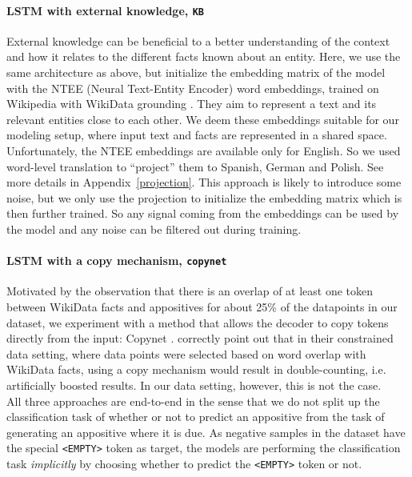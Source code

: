 \documentclass[11pt]{article}
\newcommand{\jttodo}[1]{\todo[color=blue!20]{#1}}
\begin{document}
\paragraph{LSTM with external knowledge, \texttt{KB}}
External knowledge can be beneficial to a better understanding of the context and how it relates to the different facts known about an entity. Here, we use the same architecture as above, but initialize the embedding matrix of the model with the NTEE (Neural Text-Entity Encoder) word embeddings,
trained on Wikipedia with WikiData grounding \cite{yamada-etal-2017-learning}. They aim to represent a text and its relevant entities close to each other. We deem these embeddings suitable for our modeling setup, where input text and facts are represented in a shared space. Unfortunately, the NTEE embeddings are available only for English. So we used word-level translation to ``project'' them to Spanish, German and Polish. See more details in Appendix~\ref{projection}.    This approach is likely to introduce some noise, but we only use the projection to initialize the embedding matrix which is then further trained. So any signal coming from the embeddings can be used by the model and any noise can be filtered out during training. 

\paragraph{LSTM with a copy mechanism,  \texttt{copynet}}
Motivated by the observation that there is an overlap of at least one token between WikiData facts and appositives for about 25\% of the datapoints in our dataset, we experiment with a method that allows the decoder to copy tokens directly from the input: Copynet \cite{gu-etal-2016-incorporating}.  correctly point out that in their constrained data setting, where data points were selected based on word overlap with WikiData facts, using a copy mechanism would result in double-counting, i.e. artificially boosted results. In our data setting, however, this is not the case.
\\

All three approaches are  end-to-end in the sense that we do not split up the classification task of whether or not to predict an appositive from the task of generating an appositive where it is due. As negative samples in the dataset have the special \texttt{<EMPTY>} token as target, the models are performing the classification task \textit{implicitly} by choosing whether to predict the \texttt{<EMPTY>} token or not.
\end{document}
